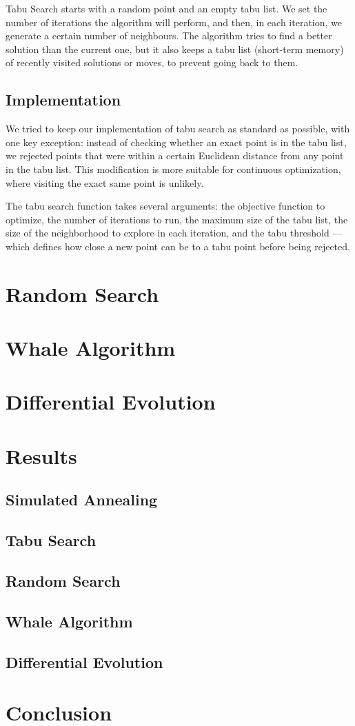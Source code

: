 \documentclass{report}
\begin{document}
Tabu Search starts with a random point and an empty tabu list. We set the number of iterations the algorithm will perform, and then, in each iteration, we generate a certain number of neighbours. The algorithm tries to find a better solution than the current one, but it also keeps a tabu list (short-term memory) of recently visited solutions or moves, to prevent going back to them.

\subsection*{Implementation}

We tried to keep our implementation of tabu search as standard as possible, with one key exception: instead of checking whether an exact point is in the tabu list, we rejected points that were within a certain Euclidean distance from any point in the tabu list. This modification is more suitable for continuous optimization, where visiting the exact same point is unlikely.

The tabu search function takes several arguments: the objective function to optimize, the number of iterations to run, the maximum size of the tabu list, the size of the neighborhood to explore in each iteration, and the tabu threshold — which defines how close a new point can be to a tabu point before being rejected.

\section*{Random Search}

\section*{Whale Algorithm}

\section*{Differential Evolution}

\section*{Results}

\subsection*{Simulated Annealing}
\subsection*{Tabu Search}
\subsection*{Random Search}
\subsection*{Whale Algorithm}
\subsection*{Differential Evolution}

\section*{Conclusion}
\end{document}
